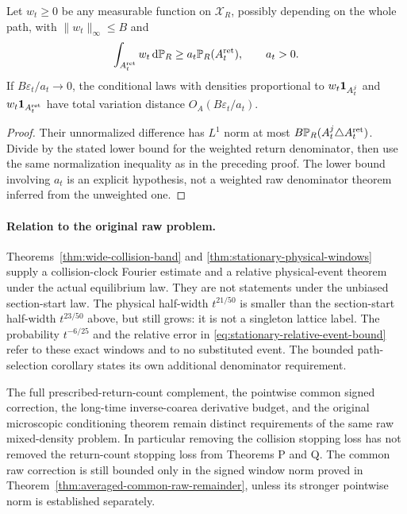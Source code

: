 \begin{corollary}
\label{cor:stationary-weighted-selection}
Let $w_t\ge0$ be any measurable function on $\mathcal X_R$, possibly
depending on the whole path, with $\|w_t\|_\infty\le B$ and
\[
 \int_{A_t^{\rm ret}}w_t\,\mathrm d\mathbb P_R
                   \ge a_t\mathbb P_R(A_t^{\rm ret}),\qquad a_t>0.
\]
If $B\varepsilon_t/a_t\to0$, the conditional laws with densities
proportional to $w_t\mathbf1_{A_t^j}$ and $w_t\mathbf1_{A_t^{\rm ret}}$
have total variation distance $O_A(B\varepsilon_t/a_t)$.
\end{corollary}
\begin{proof}
Their unnormalized difference has $L^1$ norm at most
$B\mathbb P_R(A_t^j\triangle A_t^{\rm ret})$.
Divide by the stated lower bound for the weighted return denominator,
then use the same normalization inequality as in the preceding proof.
The lower bound involving $a_t$ is an explicit hypothesis, not a
weighted raw denominator theorem inferred from the unweighted one.
\end{proof}

\paragraph{Relation to the original raw problem.}
Theorems~\ref{thm:wide-collision-band} and
\ref{thm:stationary-physical-windows} supply a collision-clock
Fourier estimate and a relative physical-event theorem under the
actual equilibrium law. They are not statements under the
unbiased section-start law. The physical half-width $t^{21/50}$
is smaller than the section-start half-width $t^{23/50}$ above,
but still grows: it is not a singleton lattice label. The probability
$t^{-6/25}$ and the relative error in
\eqref{eq:stationary-relative-event-bound} refer to these exact
windows and to no substituted event. The bounded path-selection
corollary states its own additional denominator requirement.

The full prescribed-return-count complement, the pointwise common
signed correction, the long-time inverse-coarea derivative budget,
and the original microscopic conditioning theorem remain distinct
requirements of the same raw mixed-density problem. In particular
removing the collision stopping loss has not removed the return-count
stopping loss from Theorems P and Q. The common raw correction is still
bounded only in the signed window norm proved in
Theorem~\ref{thm:averaged-common-raw-remainder}, unless its stronger
pointwise norm is established separately.
